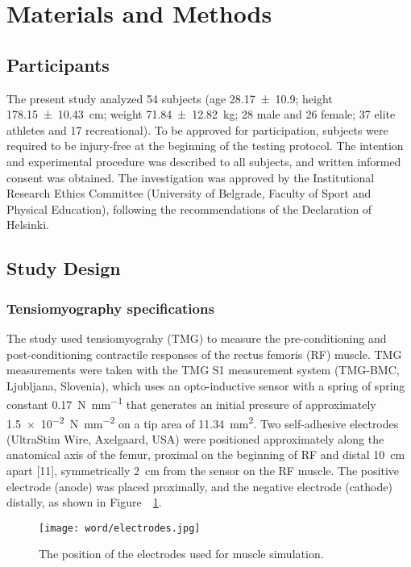 \documentclass[utf8]{FrontiersinHarvard}
\begin{document}
\section{Materials and Methods}
\subsection{Participants}
The present study analyzed 54 subjects (age \SI{28.17 \pm 10.9}{\year}; height \SI{178.15 \pm 10.43}{\centi \meter}; weight \SI{71.84 \pm 12.82}{\kilogram}; 28 male and 26 female; 37 elite athletes and 17 recreational).
To be approved for participation, subjects were required to be injury-free at the beginning of the testing protocol.
The intention and experimental procedure was described to all subjects, and written informed consent was obtained.
The investigation was approved by the Institutional Research Ethics Committee (University of Belgrade, Faculty of Sport and Physical Education), following the recommendations of the Declaration of Helsinki.

\subsection{Study Design}

\subsubsection{Tensiomyography specifications}
The study used tensiomyograhy (TMG) to measure the pre-conditioning and post-conditioning contractile responses of the rectus femoris (RF) muscle.
TMG measurements were taken with the TMG S1 measurement system (TMG-BMC, Ljubljana, Slovenia), which uses an opto-inductive sensor with a spring of spring constant \SI{0.17}{\newton \per \milli \meter} that generates an initial pressure of approximately \SI{1.5e-2}{\newton \per \milli \meter \squared} on a tip area of \SI{11.34}{\milli \meter \squared}.
Two self-adhesive electrodes (UltraStim\textregistered{} Wire, Axelgaard, USA) were positioned approximately along the anatomical axis of the femur, proximal on the beginning of RF and distal \SI{10}{\centi \meter} apart [11], symmetrically \SI{2}{\centi \meter} from the sensor on the RF muscle.
The positive electrode (anode) was placed proximally, and the negative electrode (cathode) distally, as shown in Figure~~\ref{fig:electrodes}.

\begin{figure}
	\centering
    \texttt{[image: word/electrodes.jpg]}
    \caption{The position of the electrodes used for muscle simulation.}
    \label{fig:electrodes}
\end{figure}
\end{document}
